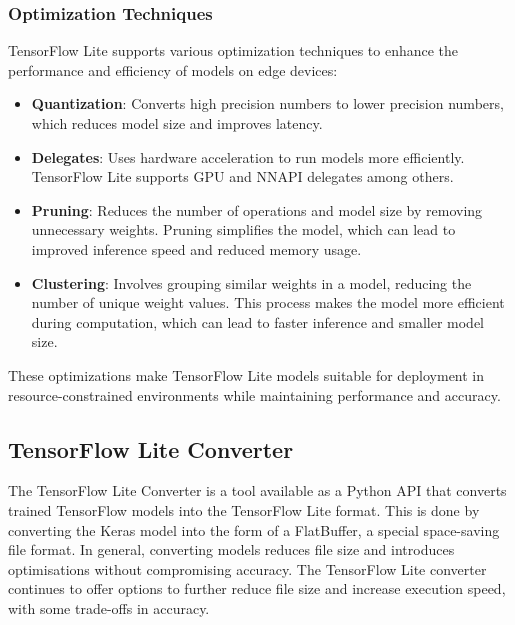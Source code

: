 \subsubsection{Optimization Techniques}
TensorFlow Lite supports various optimization techniques to enhance the performance and efficiency of models on edge devices:
\begin{itemize}
    \item \textbf{Quantization}: Converts high precision numbers to lower precision numbers, which reduces model size and improves latency.
    \item \textbf{Delegates}: Uses hardware acceleration to run models more efficiently. TensorFlow Lite supports GPU and NNAPI delegates among others.
    \item \textbf{Pruning}: Reduces the number of operations and model size by removing unnecessary weights. Pruning simplifies the model, which can lead to improved inference speed and reduced memory usage.
    \item \textbf{Clustering}: Involves grouping similar weights in a model, reducing the number of unique weight values. This process makes the model more efficient during computation, which can lead to faster inference and smaller model size.
\end{itemize}

These optimizations make TensorFlow Lite models suitable for deployment in resource-constrained environments while maintaining performance and accuracy.




\subsection{TensorFlow Lite Converter}

The TensorFlow Lite Converter is a tool available as a Python API that converts trained TensorFlow models into the TensorFlow Lite format. This is done by converting the Keras model into the form of a FlatBuffer, a special space-saving file format. In general, converting models reduces file size and introduces optimisations without compromising accuracy. The TensorFlow Lite converter continues to offer options to further reduce file size and increase execution speed, with some trade-offs in accuracy. \cite{Google.09.10.2020,Warden:2020}


